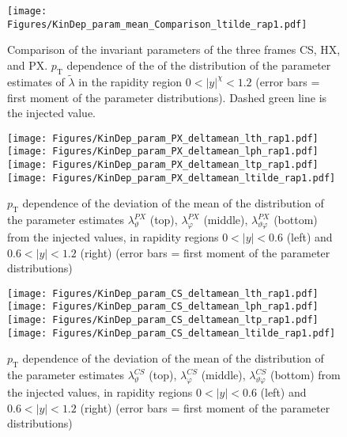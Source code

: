 \documentclass[12pt]{article}
\newcommand{\pT}{p_\mathrm{T}}
\newcommand{\absy}{\left |  y \right |}
\newcommand{\lamtilde}{\tilde{\lambda}}
\newcommand{\lamthCS}{\lambda^{\scriptscriptstyle CS}_\vartheta}
\newcommand{\lamphCS}{\lambda^{\scriptscriptstyle CS}_\varphi}
\newcommand{\lamthphCS}{\lambda^{\scriptscriptstyle CS}_{\vartheta \varphi}}
\newcommand{\lamthPX}{\lambda^{\scriptscriptstyle PX}_\vartheta}
\newcommand{\lamphPX}{\lambda^{\scriptscriptstyle PX}_\varphi}
\newcommand{\lamthphPX}{\lambda^{\scriptscriptstyle PX}_{\vartheta \varphi}}
\begin{document}




\begin{figure}[htbp]
\centering
\texttt{[image: Figures/KinDep\_param\_mean\_Comparison\_ltilde\_rap1.pdf]}
\caption{Comparison of the invariant parameters of the three frames CS, HX,
and PX. $\pT$ dependence of the of the distribution of the
parameter estimates of $\lamtilde$ in the rapidity region $0<\absy^{\chi}<1.2$ (error bars = first moment of the parameter
distributions). Dashed green line is the injected value.}
\end{figure}
\clearpage









\begin{figure}[htbp]
\centering
\texttt{[image: Figures/KinDep\_param\_PX\_deltamean\_lth\_rap1.pdf]}
\texttt{[image: Figures/KinDep\_param\_PX\_deltamean\_lph\_rap1.pdf]}
\texttt{[image: Figures/KinDep\_param\_PX\_deltamean\_ltp\_rap1.pdf]}
\texttt{[image: Figures/KinDep\_param\_PX\_deltamean\_ltilde\_rap1.pdf]}
\caption{$\pT$ dependence of the deviation of the mean of the distribution of
the parameter estimates $\lamthPX$ (top), $\lamphPX$ (middle), $\lamthphPX$
(bottom) from the injected values, in rapidity regions $0<\absy<0.6$ (left) and
$0.6<\absy<1.2$ (right) (error bars = first moment of the parameter
distributions)}
\end{figure}
\clearpage







\begin{figure}[htbp]
\centering
\texttt{[image: Figures/KinDep\_param\_CS\_deltamean\_lth\_rap1.pdf]}
\texttt{[image: Figures/KinDep\_param\_CS\_deltamean\_lph\_rap1.pdf]}
\texttt{[image: Figures/KinDep\_param\_CS\_deltamean\_ltp\_rap1.pdf]}
\texttt{[image: Figures/KinDep\_param\_CS\_deltamean\_ltilde\_rap1.pdf]}
\caption{$\pT$ dependence of the deviation of the mean of the distribution of
the parameter estimates $\lamthCS$ (top), $\lamphCS$ (middle), $\lamthphCS$
(bottom) from the injected values, in rapidity regions $0<\absy<0.6$ (left) and
$0.6<\absy<1.2$ (right) (error bars = first moment of the parameter
distributions)}
\end{figure}
\clearpage
\end{document}
